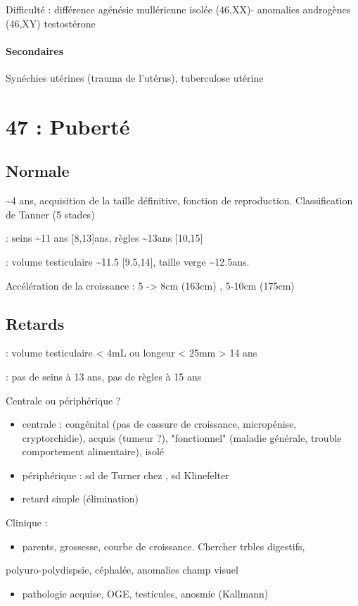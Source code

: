 \documentclass[11pt]{article}
\begin{document}
Difficulté : différence agénésie mullérienne isolée (46,XX)- anomalies androgènes
(46,XY) \thus testostérone

\paragraph{Secondaires}
\label{sec:org653001b}
Synéchies utérines (trauma de l'utérus), tuberculose utérine
\section{47 : Puberté}
\label{sec:org359f1f3}
\subsection{Normale}
\label{sec:org5df5d1c}
\textasciitilde{}4 ans, acquisition de la taille définitive, fonction de
reproduction. Classification de Tanner (5 stades)

\female : seins \textasciitilde{}11 ans [8,13]ans, règles \textasciitilde{}13ans [10,15]

\male : \inc volume testiculaire \textasciitilde{}11.5 [9.5,14], \inc taille verge \textasciitilde{}12.5ans.

Accélération de la croissance : 5 -> 8cm (163cm) \female, 5-10cm (175cm)
\subsection{Retards}
\label{sec:orgc2554be}
\male :  volume testiculaire < 4mL ou longeur < 25mm > 14 ans 

\female : pas de seins à 13 ans, pas de règles à 15 ans

Centrale ou périphérique ?
\begin{itemize}
\item centrale : congénital (pas de cassure de croissance, micropénise,
cryptorchidie), acquis (tumeur ?), "fonctionnel" (maladie générale, trouble
comportement alimentaire), isolé
\item périphérique : sd de Turner chez \female, sd Klinefelter \male
\item retard simple (élimination)
\end{itemize}

Clinique : 
\begin{itemize}
\item parents, grossesse, courbe de croissance. Chercher trbles digestifs,
\end{itemize}
polyuro-polydispsie, céphalée, anomalies champ visuel
\begin{itemize}
\item pathologie acquise, OGE, testicules, anosmie (Kallmann)
\end{itemize}
\end{document}
